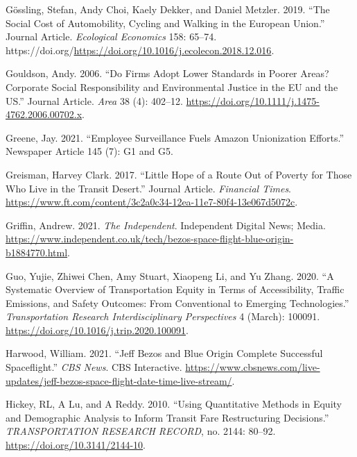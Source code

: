 \documentclass[12pt, oneside]{report}
\newlength{\cslhangindent}
\newlength{\cslentryspacingunit} %
\newenvironment{CSLReferences}[2] %
 {%
  \setlength{\parindent}{0pt}
  \ifodd #1
  \let\oldpar\par
  \def\par{\hangindent=\cslhangindent\oldpar}
  \fi
  \setlength{\parskip}{#2\cslentryspacingunit}
 }%
 {}
\begin{document}
\begin{CSLReferences}{1}{0}
\leavevmode{}%
Gössling, Stefan, Andy Choi, Kaely Dekker, and Daniel Metzler. 2019.
{``The Social Cost of Automobility, Cycling and Walking in the European
Union.''} Journal Article. \emph{Ecological Economics} 158: 65--74.
https://doi.org/\url{https://doi.org/10.1016/j.ecolecon.2018.12.016}.

\leavevmode{}%
Gouldson, Andy. 2006. {``Do Firms Adopt Lower Standards in Poorer Areas?
Corporate Social Responsibility and Environmental Justice in the EU and
the US.''} Journal Article. \emph{Area} 38 (4): 402--12.
\url{https://doi.org/10.1111/j.1475-4762.2006.00702.x}.

\leavevmode{}%
Greene, Jay. 2021. {``Employee Surveillance Fuels Amazon Unionization
Efforts.''} Newspaper Article 145 (7): G1 and G5.

\leavevmode{}%
Greisman, Harvey Clark. 2017. {``Little Hope of a Route Out of Poverty
for Those Who Live in the Transit Desert.''} Journal Article.
\emph{Financial Times}.
\url{https://www.ft.com/content/3c2a0c34-12ea-11e7-80f4-13e067d5072c}.

\leavevmode{}%
Griffin, Andrew. 2021. \emph{The Independent}. Independent Digital News;
Media.
\url{https://www.independent.co.uk/tech/bezos-space-flight-blue-origin-b1884770.html}.

\leavevmode{}%
Guo, Yujie, Zhiwei Chen, Amy Stuart, Xiaopeng Li, and Yu Zhang. 2020.
{``A Systematic Overview of Transportation Equity in Terms of
Accessibility, Traffic Emissions, and Safety Outcomes: {From}
Conventional to Emerging Technologies.''} \emph{Transportation Research
Interdisciplinary Perspectives} 4 (March): 100091.
\url{https://doi.org/10.1016/j.trip.2020.100091}.

\leavevmode{}%
Harwood, William. 2021. {``Jeff Bezos and Blue Origin Complete
Successful Spaceflight.''} \emph{CBS News}. CBS Interactive.
\url{https://www.cbsnews.com/live-updates/jeff-bezos-space-flight-date-time-live-stream/}.

\leavevmode{}%
Hickey, RL, A Lu, and A Reddy. 2010. {``Using {Quantitative Methods} in
{Equity} and {Demographic Analysis} to {Inform Transit Fare
Restructuring Decisions}.''} \emph{TRANSPORTATION RESEARCH RECORD}, no.
2144: 80--92. \url{https://doi.org/10.3141/2144-10}.


\end{CSLReferences}
\end{document}
